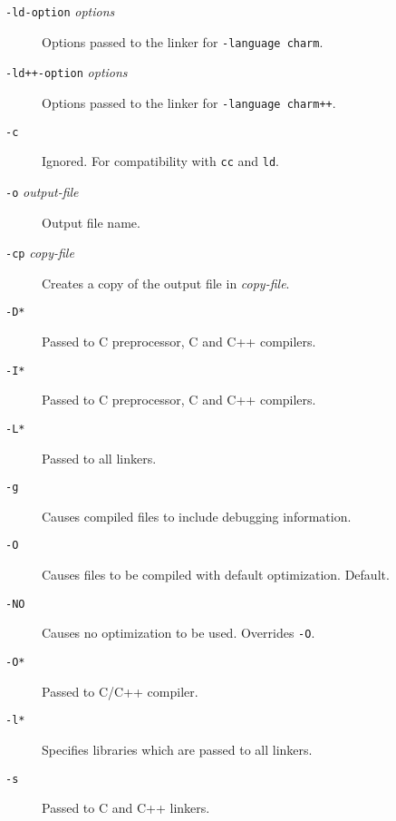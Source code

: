 \begin{description}
\item[{\tt -ld-option} {\em options}]

Options passed to the linker for {\tt -language charm}.

\item[{\tt -ld++-option} {\em options}]

Options passed to the linker for {\tt -language charm++}.

\item[{\tt -c}]

Ignored.  For compatibility with {\tt cc} and {\tt ld}.

\item[{\tt -o} {\em output-file}]

Output file name.

\item[{\tt -cp} {\em copy-file}]

Creates a copy of the output file in {\em copy-file}.

\item[{\tt -D*}]

Passed to C preprocessor, C and C++ compilers.

\item[{\tt -I*}]

Passed to C preprocessor, C and C++ compilers.

\item[{\tt -L*}]

Passed to all linkers.

\item[{\tt -g}]

Causes compiled files to include debugging information.

\item[{\tt -O}]

Causes files to be compiled with default optimization.  Default.

\item[{\tt -NO}]

Causes no optimization to be used.  Overrides {\tt -O}.

\item[{\tt -O*}]

Passed to C/C++ compiler.

\item[{\tt -l*}]

Specifies libraries which are passed to all linkers.

\item[{\tt -s}]

Passed to C and C++ linkers.

\end{description}



